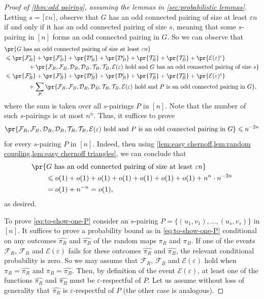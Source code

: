 \documentclass[11pt,reqno,oneside]{amsart}
\theoremstyle{definition}
\newcommand\wh[1]{\widehat{#1}}
\newcommand\1{\mathbf{1}}
\newcommand{\cE}{\mathcal{E}}
\newcommand{\comp}{\textup{c}}
\newcommand{\eps}{\varepsilon}
\let\leq\leqslant
\begin{document}
\begin{proof}[Proof of \cref{thm:odd pairing}, assuming the lemmas in \cref{sec:probabilistic lemmas}]
    Letting $s=\lceil \eps n\rceil$, observe that $G$ has an odd connected pairing of size at least $\eps n$ if and only if it has an odd connected pairing of size $s$, meaning that some $s$-pairing in $[n]$ forms an odd connected pairing in $G$. So we can observe that
    \begin{align*}
    &\pr{G\text{ has an odd connected pairing of size at least }\eps n}\\
    &\leq \pr{\mathcal F_R^\comp}+\pr{\mathcal F_B^\comp}+\pr{\mathcal D_R^\comp}+\pr{\mathcal D_B^\comp}+\pr{\mathcal T_R^\comp}+\pr{\mathcal T_B^\comp}+\pr{\cE(\eps)^\comp}\\
    &\qquad\qquad+\pr{\mathcal F_R, \mathcal F_B, \mathcal D_R, \mathcal D_B, \mathcal T_R, \mathcal T_B, \cE(\eps)\text{ hold and }G\text{ has an odd connected pairing of size }s}\\
    &\leq \pr{\mathcal F_R^\comp}+\pr{\mathcal F_B^\comp}+\pr{\mathcal D_R^\comp}+\pr{\mathcal D_B^\comp}+\pr{\mathcal T_R^\comp}+\pr{\mathcal T_B^\comp}+\pr{\cE(\eps)^\comp}\\
    &\qquad\qquad+\sum_P\pr{\mathcal F_R, \mathcal F_B, \mathcal D_R, \mathcal D_B, \mathcal T_R, \mathcal T_B, \cE(\eps)\text{ hold and }P\text{ is an odd connected pairing in }G},
    \end{align*}
    where the sum is taken over all $s$-pairings $P$ in $[n]$. Note that the number of such $s$-pairings is at most $n^n$. Thus, it suffices to prove
    \begin{equation}\label{eq:to-show-one-P}
        \pr{\mathcal F_R, \mathcal F_B, \mathcal D_R, \mathcal D_B, \mathcal T_R, \mathcal T_B, \cE(\eps)\text{ hold and }P\text{ is an odd connected pairing in }G}\leq n^{-2n}
    \end{equation}
    for every $s$-pairing $P$ in $[n]$. Indeed, then using \cref{lem:easy chernoff,lem:random coupling,lem:easy chernoff triangles}, we can conclude that
    \begin{align*}
    &\pr{G\text{ has an odd connected pairing of size at least }\eps n}\\
    &\qquad\leq o(1)+o(1)+o(1)+o(1)+o(1)+o(1)+o(1)+n^n\cdot n^{-2n}\\
    &\qquad=o(1)+n^{-n}=o(1),
    \end{align*}
    as desired.

    To prove \cref{eq:to-show-one-P} consider an $s$-pairing $P=\{(u_1,v_1),\dots,(u_{s},v_{s})\}$ in $[n]$. It suffices to prove a probability bound as in \cref{eq:to-show-one-P} conditional on any outcomes $\wh{\pi_R}$ and $\wh{\pi_B}$ of the random maps $\pi_R$ and $\pi_B$. If one of the events $\mathcal F_R$,  $\mathcal F_B$ and $\cE(\eps)$ fails for these outcomes $\wh{\pi_R}$ and $\wh{\pi_B}$, the relevant conditional probability is zero. So we may assume that $\mathcal F_R$,  $\mathcal F_B$ and $\cE(\eps)$ hold when $\pi_R=\wh{\pi_R}$ and $\pi_B=\wh{\pi_B}$. Then, by definition of the event $\cE(\eps)$, at least one of the  functions $\wh{\pi_R}$ and $\wh{\pi_B}$ must be $\varepsilon$-respectful of $P$. Let us assume without loss of generality that $\wh{\pi_R}$ is $\varepsilon$-respectful of $P$ (the other case is analogous).


\end{proof}
\end{document}
